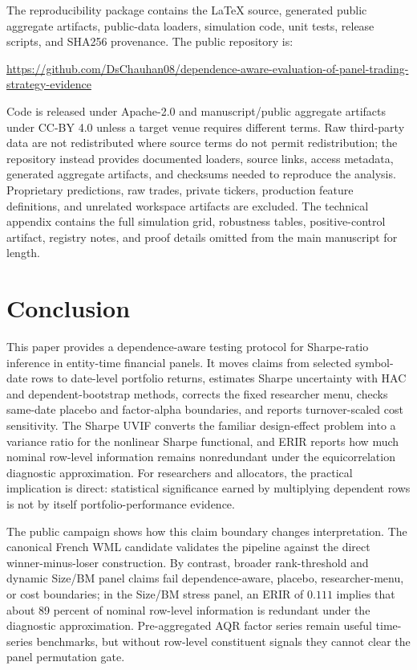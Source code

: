 \documentclass[12pt,a4paper]{article}
\newif\ifblinded
\begin{document}
The reproducibility package contains the LaTeX source, generated public
aggregate artifacts, public-data loaders, simulation code, unit tests,
release scripts, and SHA256 provenance.  The public repository is:
\ifblinded
{\scriptsize\noindent Repository link omitted from the review manuscript
to preserve double-blind anonymity; it is supplied in the separate title
page and submission metadata.\par}
\else
{\scriptsize\noindent
\url{https://github.com/DsChauhan08/dependence-aware-evaluation-of-panel-trading-strategy-evidence}\par}
\fi
Code is released under Apache-2.0 and manuscript/public aggregate
artifacts under CC-BY 4.0 unless a target venue requires different terms.
Raw third-party data are not
redistributed where source terms do not permit redistribution; the
repository instead provides documented loaders, source links, access
metadata, generated aggregate artifacts, and checksums needed to
reproduce the analysis.  Proprietary predictions, raw trades, private
tickers, production feature definitions, and unrelated workspace
artifacts are excluded.  The technical appendix contains the full
simulation grid, robustness tables, positive-control artifact, registry
notes, and proof details omitted from the main manuscript for length.

\section{Conclusion}

This paper provides a dependence-aware testing protocol for Sharpe-ratio
inference in entity-time financial panels.  It moves claims from
selected symbol-date rows to date-level portfolio returns, estimates
Sharpe uncertainty with HAC and dependent-bootstrap methods, corrects
the fixed researcher menu, checks same-date placebo and factor-alpha
boundaries, and reports turnover-scaled cost sensitivity.  The Sharpe
UVIF converts the familiar design-effect problem into a variance ratio
for the nonlinear Sharpe functional, and ERIR reports how much nominal
row-level information remains nonredundant under the equicorrelation
diagnostic approximation.  For researchers and allocators, the practical implication
is direct: statistical significance earned by multiplying dependent rows
is not by itself portfolio-performance evidence.

The public campaign shows how this claim boundary changes interpretation.
The canonical French WML candidate validates the pipeline against the
direct winner-minus-loser construction.  By contrast, broader
rank-threshold and dynamic Size/BM panel claims fail dependence-aware,
placebo, researcher-menu, or cost boundaries; in the Size/BM stress
panel, an ERIR of \(0.111\) implies that about 89 percent of nominal
row-level information is redundant under the diagnostic approximation.
Pre-aggregated AQR factor series remain useful time-series benchmarks,
but without row-level constituent signals they cannot clear the panel
permutation gate.
\end{document}
